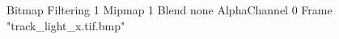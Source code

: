 {Bitmap
	{Filtering 1}
	{Mipmap 1}
	{Blend none}
	{AlphaChannel 0}
	{Frame "track_light_x.tif.bmp"}
}
